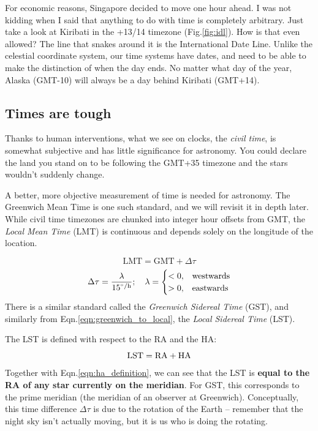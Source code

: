 \documentclass{article}
\begin{document}
For economic reasons, Singapore decided to move one hour ahead. I was not kidding when I said that anything to do with time is completely arbitrary. Just take a look at Kiribati in the +13/14 timezone (Fig.\;\ref{fig:idl}). How is that even allowed? The line that snakes around it is the International Date Line. 
Unlike the celestial coordinate system, our time systems have dates, and need to be able to make the distinction of when the day ends. No matter what day of the year, Alaska (GMT-10) will always be a day behind Kiribati (GMT+14).

\subsection{Times are tough}
Thanks to human interventions, what we see on clocks, the \textit{civil time}, is somewhat subjective and has little significance for astronomy. You could declare the land you stand on to be following the GMT+35 timezone and the stars wouldn't suddenly change. 

A better, more objective measurement of time is needed for astronomy. The Greenwich Mean Time is one such standard, and we will revisit it in depth later. While civil time timezones are chunked into integer hour offsets from GMT, the \textit{Local Mean Time} (LMT) is continuous and depends solely on the longitude of the location.

\begin{equation}
\label{eqn:greenwich_to_local}
    \mathrm{LMT} = \mathrm{GMT} + \Delta \tau
\end{equation}
\begin{equation}
    \Delta \tau = \frac{\lambda}{15^\mathrm{{}^{\circ}/h}};\quad\lambda=
    \begin{cases}
        < 0,& \mathrm{westwards} \\
        > 0,& \mathrm{eastwards}
    \end{cases}
\end{equation}
There is a similar standard called the \textit{Greenwich Sidereal Time} (GST), and similarly from Eqn.\;\ref{eqn:greenwich_to_local}, the \textit{Local Sidereal Time} (LST).

The LST is defined with respect to the RA and the HA:
\begin{equation}
    \mathrm{LST} = \mathrm{RA} + \mathrm{HA}
\end{equation}
Together with Eqn.\;\ref{eqn:ha_definition}, we can see that the LST is \textbf{equal to the RA of any star currently on the meridian}. For GST, this corresponds to the prime meridian (the meridian of an observer at Greenwich). Conceptually, this time difference $\Delta \tau$ is due to the rotation of the Earth -- remember that the night sky isn't actually moving, but it is us who is doing the rotating.
\end{document}
